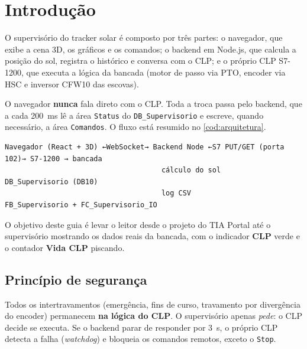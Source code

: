 \documentclass[12pt, oneside, a4paper, chapter=TITLE, section=TITLE, english, brazil]{abntex2}
\begin{document}
\tableofcontents*
\cleardoublepage

\textual

\chapter{Introdução}

O supervisório do tracker solar é composto por três partes: o navegador, que exibe a cena 3D, os gráficos e os comandos; o backend em Node.js, que calcula a posição do sol, registra o histórico e conversa com o CLP; e o próprio CLP S7-1200, que executa a lógica da bancada (motor de passo via PTO, encoder via HSC e inversor CFW10 das escovas).

O navegador \textbf{nunca} fala direto com o CLP. Toda a troca passa pelo backend, que a cada 200~ms lê a área \texttt{Status} do \texttt{DB\_Supervisorio} e escreve, quando necessário, a área \texttt{Comandos}. O fluxo está resumido no \autoref{cod:arquitetura}.

\begin{lstlisting}[caption={Arquitetura da comunicação}, label={cod:arquitetura}]
Navegador (React + 3D) ←WebSocket→ Backend Node ←S7 PUT/GET (porta 102)→ S7-1200 → bancada
                                     cálculo do sol             DB_Supervisorio (DB10)
                                     log CSV                    FB_Supervisorio + FC_Supervisorio_IO
\end{lstlisting}

O objetivo deste guia é levar o leitor desde o projeto do TIA Portal até o supervisório mostrando os dados reais da bancada, com o indicador \textbf{CLP} verde e o contador \textbf{Vida CLP} piscando.

\section{Princípio de segurança}

Todos os intertravamentos (emergência, fins de curso, travamento por divergência do encoder) permanecem \textbf{na lógica do CLP}. O supervisório apenas \emph{pede}: o CLP decide se executa. Se o backend parar de responder por 3~s, o próprio CLP detecta a falha (\emph{watchdog}) e bloqueia os comandos remotos, exceto o \texttt{Stop}.
\end{document}
